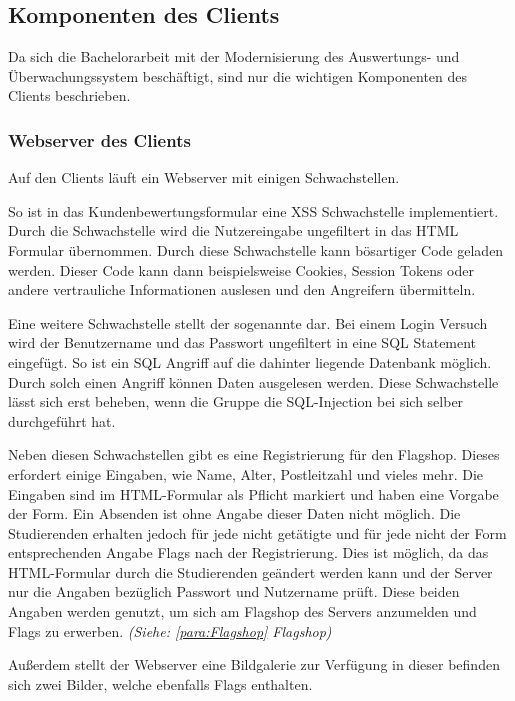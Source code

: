 \subsection{Komponenten des Clients}\label{subsec:Komponente_des_Clients}
Da sich die Bachelorarbeit mit der Modernisierung des Auswertungs- und Überwachungssystem beschäftigt, sind nur die wichtigen Komponenten des Clients beschrieben.

\subsubsection{Webserver des Clients}\label{subsubsec:Webserver_des_Clients}
Auf den Clients läuft ein Webserver mit einigen Schwachstellen. 

So ist in das Kundenbewertungsformular eine XSS Schwachstelle implementiert. Durch die Schwachstelle wird die Nutzereingabe ungefiltert in das HTML Formular übernommen. Durch diese Schwachstelle kann bösartiger Code geladen werden. Dieser Code kann dann beispielsweise Cookies, Session Tokens oder andere vertrauliche Informationen auslesen und den Angreifern übermitteln. 

Eine weitere Schwachstelle stellt der sogenannte  dar. Bei einem Login Versuch wird der Benutzername und das Passwort ungefiltert in eine SQL Statement eingefügt. So ist ein SQL Angriff auf die dahinter liegende Datenbank möglich. Durch solch einen Angriff können Daten ausgelesen werden. Diese Schwachstelle lässt sich erst beheben, wenn die Gruppe die SQL-Injection bei sich selber durchgeführt hat.

Neben diesen Schwachstellen gibt es eine Registrierung für den Flagshop. Dieses erfordert einige Eingaben, wie Name, Alter, Postleitzahl und vieles mehr. Die Eingaben sind im HTML-Formular als Pflicht markiert und haben eine Vorgabe der Form. Ein Absenden ist ohne Angabe dieser Daten nicht möglich. Die Studierenden erhalten jedoch für jede nicht getätigte und für jede nicht der Form entsprechenden Angabe Flags nach der Registrierung. Dies ist möglich, da das HTML-Formular durch die Studierenden geändert werden kann und der Server nur die Angaben bezüglich Passwort und Nutzername prüft. Diese beiden Angaben werden genutzt, um sich am Flagshop des Servers anzumelden und Flags zu erwerben. \textit{(Siehe: \ref{para:Flagshop} Flagshop)}

Außerdem stellt der Webserver eine Bildgalerie zur Verfügung in dieser befinden sich zwei Bilder, welche ebenfalls Flags enthalten.
